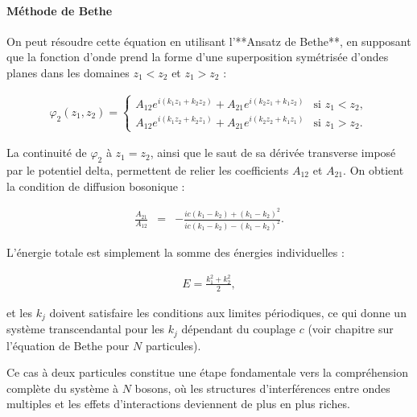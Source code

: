 \paragraph{Méthode de Bethe}

On peut résoudre cette équation en utilisant l’**Ansatz de Bethe**, en supposant que la fonction d’onde prend la forme d’une superposition symétrisée d’ondes planes dans les domaines \(z_1 < z_2\) et \(z_1 > z_2\) :

\begin{eqnarray}
	\varphi_2(z_1, z_2) = \begin{cases}
		A_{12} e^{i(k_1 z_1 + k_2 z_2)} + A_{21} e^{i(k_2 z_1 + k_1 z_2)} & \text{si } z_1 < z_2, \\
		A_{12} e^{i(k_1 z_2 + k_2 z_1)} + A_{21} e^{i(k_2 z_2 + k_1 z_1)} & \text{si } z_1 > z_2.
	\end{cases}
\end{eqnarray}

La continuité de \(\varphi_2\) à \(z_1 = z_2\), ainsi que le saut de sa dérivée transverse imposé par le potentiel delta, permettent de relier les coefficients \(A_{12}\) et \(A_{21}\). On obtient la condition de diffusion bosonique :

\begin{eqnarray}
	\frac{A_{21}}{A_{12}} & = & - \frac{ic(k_1 - k_2) + (k_1 - k_2)^2}{ic(k_1 - k_2) - (k_1 - k_2)^2}.
\end{eqnarray}

L’énergie totale est simplement la somme des énergies individuelles :

\begin{eqnarray}
	E = \frac{k_1^2 + k_2^2}{2},
\end{eqnarray}

et les \(k_j\) doivent satisfaire les conditions aux limites périodiques, ce qui donne un système transcendantal pour les \(k_j\) dépendant du couplage \(c\) (voir chapitre sur l'équation de Bethe pour \(N\) particules).

\vspace{1em}
Ce cas à deux particules constitue une étape fondamentale vers la compréhension complète du système à \(N\) bosons, où les structures d’interférences entre ondes multiples et les effets d’interactions deviennent de plus en plus riches.

